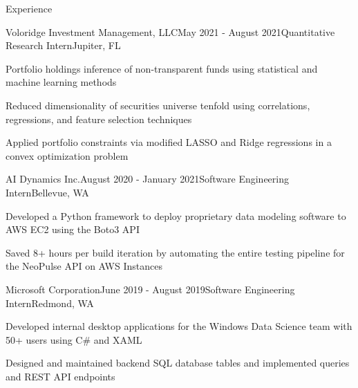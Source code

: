 \documentclass{resume} %
\begin{document}
\begin{rSection}{Experience}
\begin{rSubsection}{Voloridge Investment Management, LLC}{May 2021 - August 2021}{Quantitative Research Intern}{Jupiter, FL}
    \item Portfolio holdings inference of non-transparent funds using statistical and machine learning methods
    \item Reduced dimensionality of securities universe tenfold using correlations, regressions, and feature selection techniques
    \item Applied portfolio constraints via modified LASSO and Ridge regressions in a convex optimization problem
\end{rSubsection}

\begin{rSubsection}{AI Dynamics Inc.}{August 2020 - January 2021}{Software Engineering Intern}{Bellevue, WA}
    \item Developed a Python framework to deploy proprietary data modeling software to AWS EC2 using the Boto3 API
    \item Saved 8+ hours per build iteration by automating the entire testing pipeline for the NeoPulse API on AWS Instances
\end{rSubsection}

\begin{rSubsection}{Microsoft Corporation}{June 2019 - August 2019}{Software Engineering Intern}{Redmond, WA}
    \item Developed internal desktop applications for the Windows Data Science team with 50+ users using C\# and XAML
    \item Designed and maintained backend SQL database tables and implemented queries and REST API endpoints
\end{rSubsection}

\end{rSection}

\end{document}
